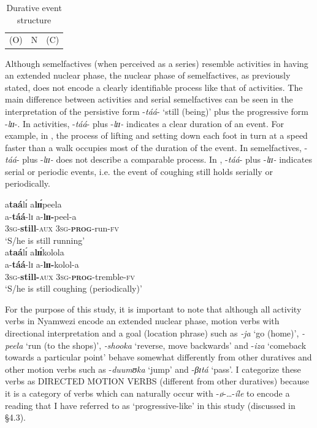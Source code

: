 \documentclass[output=paper,newtxmath,modfonts,nonflat,draftmode]{langsci/langscibook}
\begin{document}
\begin{table}
\caption{Durative event structure}
\label{fig:kanijo:6}
\begin{tabularx}{.5\textwidth}{c|c|c}
\cline{1-3}
(O) & N & (C)\\
\cline{1-3}
\end{tabularx}
\end{table} 

  Although semelfactives (when perceived as a series) resemble activities in having an extended nuclear phase, the nuclear phase of semelfactives, as previously stated, does not encode a clearly identifiable process like that of activities. The main difference between activities and serial semelfactives can be seen in the interpretation of the persistive form -\textit{táá}- ‘still (being)’ plus the progressive form -\textit{lɪɪ}-. In activities, -\textit{táá}- plus -\textit{lɪɪ-} indicates a clear duration of an event. For example, in , the process of lifting and setting down each foot in turn at a speed faster than a walk occupies most of the duration of the event. In semelfactives, -\textit{táá}- plus -\textit{lɪɪ-} does not describe a comparable process. In , -\textit{táá}- plus -\textit{lɪɪ-} indicates serial or periodic events, i.e. the event of coughing still holds serially or periodically.

\ea \label{ex:kanijo:14}
\ea \label{ex:kanijo:14a}
\glll a\textbf{taá}lɪ́ a\textbf{lɪɪ́}peela\\ 
a-\textbf{táá}-lɪ  a-\textbf{lɪɪ}\textbf{-}peel-a\\
3\textsc{sg}-\textbf{still}-\textsc{aux} 3\textsc{sg}-\textbf{\textsc{prog}}-run-\textsc{fv}\\ 
\glt ‘S/he is still running’\\
\ex \label{ex:kanijo:14b}
\glll a\textbf{taá}lɪ́      a\textbf{l}\textbf{ɪɪ́}kolola\\
a-\textbf{táá}-lɪ            a-\textbf{lɪɪ-}kolol-a\\  
3\textsc{sg}-\textbf{still-}\textsc{aux} 3\textsc{sg}-\textbf{\textsc{prog}}-tremble-\textsc{fv}\\
\glt ‘S/he is still coughing (periodically)’\\  
\z
\z

For the purpose of this study, it is important to note that although all activity verbs in Nyamwezi encode an extended nuclear phase, motion verbs with directional interpretation and a goal (location phrase) such as \textit{-ja} ‘go (home)’, \textit{-peela} ‘run (to the shops)’, \textit{-shooka} ‘reverse, move backwards’ and -\textit{iza} ‘comeback towards a particular point’ behave somewhat differently from other duratives and other motion verbs such as -\textit{duumʊ}\textit{ka} ‘jump’ and -\textit{βɪ}\textit{tá} ‘pass’. I categorize these verbs as DIRECTED MOTION VERBS (different from other duratives) because it is a category of verbs which can naturally occur with -\textit{ø}-…-\textit{íle} to encode a reading that I have referred to as ‘progressive-like’ in this study (discussed in §4.3).
\end{document}
